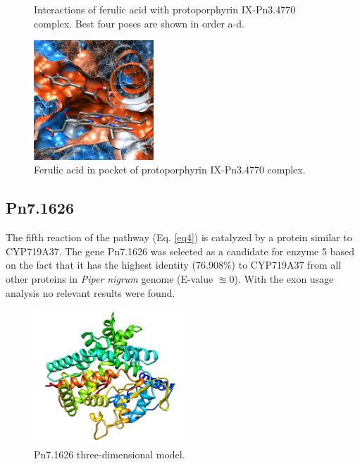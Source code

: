 \documentclass[12pt]{article}
\begin{document}
\begin{figure}[h!]
\begin{subfigure}[h!]{0.35\textwidth}
			\caption{}
		\end{subfigure}
		\hfill
		\caption[Interactions between ferulic acid and protoporphyrin IX-Pn3.4770 complex.]{\centering Interactions of ferulic acid with protoporphyrin IX-Pn3.4770 complex. Best four poses are shown in order a-d.}
		\label{fig5k_6}
	\end{figure}
	\FloatBarrier
	
	\FloatBarrier
	\begin{figure}[h!]
		\centering
		\includegraphics[width=0.4\textwidth]{../5/known/Dock/Dock2/chimera.png}
		\caption{\centering Ferulic acid in pocket of protoporphyrin IX-Pn3.4770 complex.}
		\label{fig5k_7}
	\end{figure}
	\FloatBarrier
	
	\subsection{Pn7.1626}
	
	The fifth reaction of the pathway (Eq. \ref{eq4}) is catalyzed by a protein similar to CYP719A37. The gene Pn7.1626 was selected as a candidate for enzyme 5 based on the fact that it has the highest identity (76.908\%) to CYP719A37 from all other proteins in \textit{Piper nigrum} genome (E-value $\approxeq 0$). With the exon usage analysis no relevant results were found.
	
	\FloatBarrier
	\begin{figure}
		\centering
		\includegraphics[width=0.5\textwidth]{../5/propose/Minimize/model2.png}
		\caption{\centering Pn7.1626 three-dimensional model.}
		\label{fig5p_1}
	\end{figure}
	\FloatBarrier
	
\end{document}
